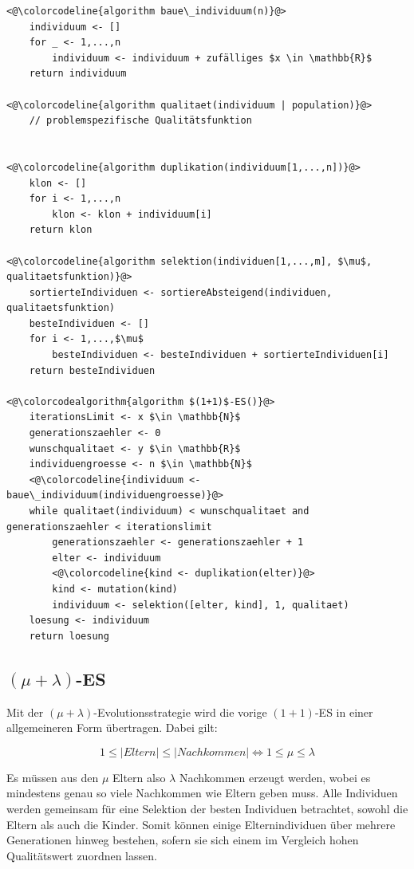 \begin{lstlisting}[caption={$(1+1)$-Evolutionsstrategie}, firstnumber=1, captionpos=b, label=lst:1_und_1_es]
<@\colorcodeline{algorithm baue\_individuum(n)}@>
	individuum <- []	
	for _ <- 1,...,n
		individuum <- individuum + zufälliges $x \in \mathbb{R}$
	return individuum
	
<@\colorcodeline{algorithm qualitaet(individuum | population)}@>
	// problemspezifische Qualitätsfunktion

	
<@\colorcodeline{algorithm duplikation(individuum[1,...,n])}@>
	klon <- []
	for i <- 1,...,n
		klon <- klon + individuum[i]
	return klon
	
<@\colorcodeline{algorithm selektion(individuen[1,...,m], $\mu$, qualitaetsfunktion)}@>
	sortierteIndividuen <- sortiereAbsteigend(individuen, qualitaetsfunktion)
	besteIndividuen <- []
	for i <- 1,...,$\mu$
		besteIndividuen <- besteIndividuen + sortierteIndividuen[i]
	return besteIndividuen

<@\colorcodealgorithm{algorithm $(1+1)$-ES()}@>
	iterationsLimit <- x $\in \mathbb{N}$
	generationszaehler <- 0
	wunschqualitaet <- y $\in \mathbb{R}$
	individuengroesse <- n $\in \mathbb{N}$
	<@\colorcodeline{individuum <- baue\_individuum(individuengroesse)}@>
	while qualitaet(individuum) < wunschqualitaet and generationszaehler < iterationslimit
		generationszaehler <- generationszaehler + 1
		elter <- individuum
		<@\colorcodeline{kind <- duplikation(elter)}@>
		kind <- mutation(kind)
		individuum <- selektion([elter, kind], 1, qualitaet)
	loesung <- individuum
	return loesung
\end{lstlisting}

\subsection{$(\mu + \lambda)$-ES}

Mit der $(\mu + \lambda)$-Evolutionsstrategie wird die vorige $(1+1)$-ES in einer allgemeineren Form übertragen.
Dabei gilt:

\begin{equation}
1 \le |Eltern| \le |Nachkommen| \Leftrightarrow 1 \le \mu \le \lambda
\end{equation}

Es müssen aus den $\mu$ Eltern also $\lambda$ Nachkommen erzeugt werden, wobei es mindestens genau so viele Nachkommen wie Eltern geben muss.
Alle Individuen werden gemeinsam für eine Selektion der besten Individuen betrachtet, sowohl die Eltern als auch die Kinder.
Somit können einige Elternindividuen über mehrere Generationen hinweg bestehen, sofern sie sich einem im Vergleich hohen Qualitätswert zuordnen lassen.

